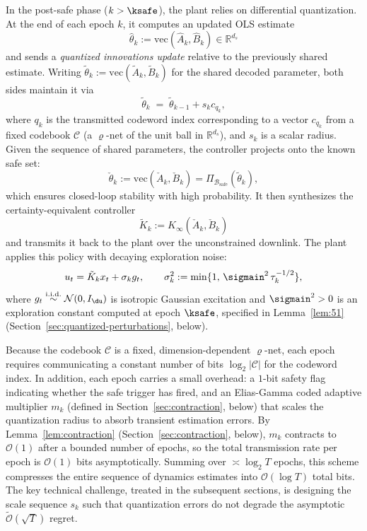 \documentclass[11pt,journal,onecolumn]{IEEEtran}
\begin{document}
In the post-safe phase ($k > \ksafe$), the plant relies on differential quantization. At the end of each epoch $k$, it computes an updated OLS estimate
\begin{equation}\label{eq:theta-hat}
    \hat\theta_k := \mathrm{vec}(\hat A_k,\hat B_k) \in \mathbb{R}^{d_s}
\end{equation}
and sends a \emph{quantized innovations update} relative to the previously shared estimate. Writing $\tilde\theta_k := \mathrm{vec}(\tilde A_k, \tilde B_k)$ for the shared decoded parameter, both sides maintain it via
\begin{equation}\label{eq:diff-update}
    \tilde\theta_k \;=\; \tilde\theta_{k-1} + s_k c_{q_k},
\end{equation}
where $q_k$ is the transmitted codeword index corresponding to a vector $c_{q_k}$ from a fixed codebook $\mathcal C$ (a $\varrho$-net of the unit ball in $\mathbb R^{d_s}$), and $s_k$ is a scalar radius. Given the sequence of shared parameters, the controller projects onto the known safe set:
\begin{equation}\label{eq:safe-proj-overview}
    \check\theta_k := \mathrm{vec}(\check A_k, \check B_k) = \Pi_{\mathcal{B}_{\mathrm{safe}}}(\tilde{\theta}_k),
\end{equation}
which ensures closed-loop stability with high probability. It then synthesizes the certainty-equivalent controller
\begin{equation}\label{eq:Ktil-overview}
    \tilde K_k := K_\infty(\check A_k, \check B_k)
\end{equation}
and transmits it back to the plant over the unconstrained downlink. The plant applies this policy with decaying exploration noise:
\begin{equation}\label{eq:control-input}
    u_t = \tilde K_k x_t + \sigma_k g_t, \qquad \sigma_k^2 := \min\{1,\,\sigmain^2\,\tau_k^{-1/2}\},
\end{equation}
where $g_t \overset{\mathrm{i.i.d.}}{\sim} \mathcal{N}(0, I_{\du})$ is isotropic Gaussian excitation and $\sigmain^2 > 0$ is an exploration constant computed at epoch $\ksafe$, specified in Lemma~\ref{lem:51} (Section~\ref{sec:quantized-perturbations}, below).

Because the codebook $\mathcal C$ is a fixed, dimension-dependent $\varrho$-net, each epoch requires communicating a constant number of bits $\log_2|\mathcal C|$ for the codeword index. In addition, each epoch carries a small overhead: a $1$-bit safety flag indicating whether the safe trigger has fired, and an Elias-Gamma coded adaptive multiplier $m_k$ (defined in Section~\ref{sec:contraction}, below) that scales the quantization radius to absorb transient estimation errors. By Lemma~\ref{lem:contraction} (Section~\ref{sec:contraction}, below), $m_k$ contracts to $\mathcal{O}(1)$ after a bounded number of epochs, so the total transmission rate per epoch is $\mathcal{O}(1)$ bits asymptotically. Summing over $\asymp \log_2 T$ epochs, this scheme compresses the entire sequence of dynamics estimates into $\mathcal{O}(\log T)$ total bits. The key technical challenge, treated in the subsequent sections, is designing the scale sequence $s_k$ such that quantization errors do not degrade the asymptotic $\tilde{\mathcal{O}}(\sqrt{T})$ regret.
\end{document}
